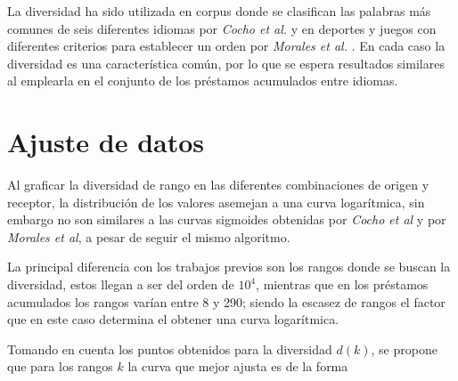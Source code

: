 La diversidad ha sido utilizada en corpus donde se clasifican las palabras más comunes de seis diferentes idiomas  por \textit{Cocho et al.} \cite{iplosone} y en  deportes y juegos  con diferentes criterios para establecer un orden por \textit{Morales et al.} \cite{epj}. En cada caso la diversidad es una característica común, por lo que se espera resultados similares al emplearla en el conjunto de los préstamos acumulados entre idiomas. 
 







\section{Ajuste de datos}

Al graficar la diversidad de rango en las diferentes combinaciones de origen y receptor, la distribución de los valores asemejan a una curva logarítmica, sin embargo no son similares a las curvas sigmoides obtenidas  por \textit{Cocho et al} y  por \textit{Morales et al}, a pesar de seguir el mismo algoritmo.   

La principal diferencia con  los trabajos previos son los rangos donde se buscan la diversidad, estos llegan a ser del orden de $10^{4}$, mientras que en los préstamos acumulados  los rangos varían entre 8 y 290; siendo la escasez de rangos el factor que en este caso determina el obtener una curva logarítmica. 

Tomando en cuenta los puntos obtenidos para la diversidad $d(k)$, se propone que para los rangos $k$ la curva que mejor ajusta es de la forma

